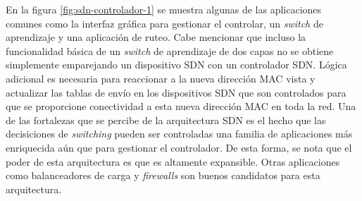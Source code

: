 \documentclass[10pt,journal,compsoc]{IEEEtran}
\begin{document}
En la figura \ref{fig:sdn-controlador-1} se muestra algunas de las aplicaciones comunes como la interfaz gráfica para gestionar el controlar, un \emph{switch} de aprendizaje y una aplicación de ruteo. Cabe mencionar que incluso la funcionalidad básica de un \emph{switch} de aprendizaje de dos capas no se obtiene simplemente emparejando un dispositivo SDN con un controlador SDN. Lógica adicional es necesaria para reaccionar a la nueva dirección MAC vista y actualizar las tablas de envío en los dispositivos SDN que son controlados para que se proporcione conectividad a esta nueva dirección MAC en toda la red. Una de las fortalezas que se percibe de la arquitectura SDN es el hecho que las decisiciones de \emph{switching} pueden ser controladas una familia de aplicaciones más enriquecida aún que para gestionar el controlador. De esta forma, se nota que el poder de esta  arquitectura es que es altamente expansible. Otras aplicaciones como balanceadores de carga y \emph{firewalls} son buenos candidatos para esta arquitectura. 
\end{document}
